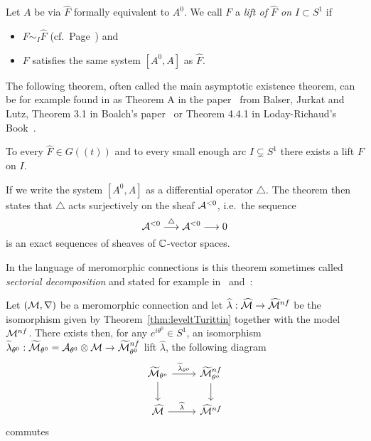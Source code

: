\begin{defn}\label{defn:lift}
  Let $A$ be via $\hat F$ formally equivalent to $A^0$.
  We call $F$ a \emph{lift of $\hat F$ on $I\subset S^1$} if
  \begin{itemize}
    \item $F\sim_I\hat F$
      (cf.\ Page~\pageref{page:notationForAsymptoticExpansion}) and
    \item $F$ satisfies the same system $[A^0,A]$ as $\hat F$.
  \end{itemize}
\end{defn}
The following theorem, often called the main asymptotic existence theorem, can
be for example found in as Theorem A in the paper~\cite{BJL1979Birkhoff} from
Balser, Jurkat and Lutz, Theorem 3.1 in Boalch's paper~\cite{boalch}
or Theorem 4.4.1 in Loday-Richaud's Book~\cite{Loday2014}.
\begin{thm}[M.A.E.T]\label{thm:maet}
  To every $\hat F\in G(\!(t)\!)$ and to every small enough arc
  $I\subsetneq S^1$ there exists a lift $F$ on $I$.
  \begin{s-rem}
    If we write the system $[A^0,A]$ as a differential operator $\triangle$.
    The theorem then states that $\triangle$ acts surjectively on the sheaf
    $\mathcal{A}^{<0}$, i.e.\ the sequence
    \[
      \mathcal{A}^{<0}\overset{\triangle}\longrightarrow\mathcal{A}^{<0} \longrightarrow 0
    \]
    is an exact sequences of sheaves of $\mathbb{C}$-vector spaces.
    \begin{comment}
      (cf.~\cite[App.1;Thm.1]{malgrange1991})
    \end{comment}
  \end{s-rem}
\end{thm}
\begin{rem}
  In the language of meromorphic connections is this theorem sometimes called
  \emph{sectorial decomposition} and stated for example
  in~\cite[Thm.II.5.12]{sabbah2007isomonodromic}
  and~\cite[Sec.II.2.4]{sabbah_cimpa90}:
  \begin{s-thm}\label{thm:sectorialDecompFromMAET}
    Let $(\mathcal{M},\nabla)$ be a meromorphic connection and let
    $\widehat\lambda:\widehat{\mathcal{M}}\to\widehat{\mathcal{M}}^{nf}$ be the isomorphism given by
    Theorem~\ref{thm:leveltTurittin} together with the model $\mathcal{M}^{nf}$.
    There exists then, for any $e^{i\theta^0}\in S^1$, an isomorphism
    $\widetilde\lambda_{\theta^0}:
    \widetilde{\mathcal{M}}_{\theta^0}=\mathcal{A}_{\theta^0}\otimes\mathcal{M}\to\widetilde{\mathcal{M}}_{\theta^0}^{nf}$
    lift $\hat\lambda$,  the following diagram
    \[ \begin{tikzcd}
        \tilde\cM_{\theta^o} \dar \rar{\tilde\lambda_{\theta^o}}
        & \tilde\cM^{nf}_{\theta^o} \dar
        \\\hat\cM \rar{\hat\lambda}
        & \hat\cM^{nf}
    \end{tikzcd} \]
    commutes
  \end{s-thm}
\end{rem}

